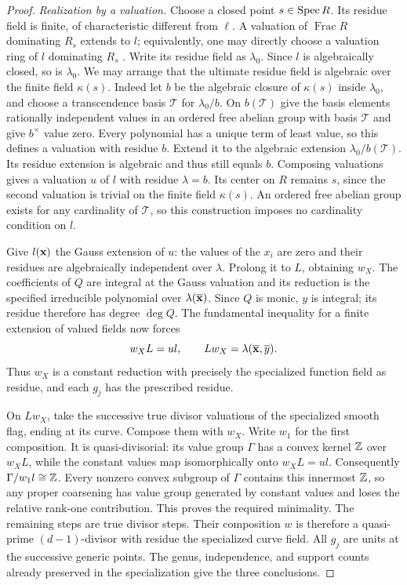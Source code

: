 \begin{proof}
\emph{Realization by a valuation.}
Choose a closed point $s\in\operatorname{Spec} R$.  Its residue field is finite, of
characteristic different from $\ell$.  A valuation of $\operatorname{Frac}R$
dominating $R_s$ extends to $l$; equivalently, one may directly choose a
valuation ring of $l$ dominating $R_s$
\cite[Lemma~10.50.2, Tag~00IA]{Stacks}.
Write its residue field as $\lambda_0$.
Since $l$ is algebraically closed, so is $\lambda_0$.
We may arrange that the ultimate residue field is algebraic over the
finite field $\kappa(s)$.  Indeed let $b$ be the algebraic closure of
$\kappa(s)$ inside $\lambda_0$, and choose a transcendence basis
$\mathcal T$ for $\lambda_0/b$.  On $b(\mathcal T)$ give the basis
elements rationally independent values in an ordered free abelian group
with basis $\mathcal T$ and give $b^\times$ value zero.
Every polynomial has a unique term of least value, so this defines a
valuation with residue $b$.  Extend it to the algebraic extension
$\lambda_0/b(\mathcal T)$.  Its residue extension is algebraic and thus
still equals $b$.  Composing valuations gives a valuation $u$ of $l$
with residue $\lambda=b$.  Its center on $R$ remains $s$, since the
second valuation is trivial on the finite field $\kappa(s)$.
An ordered free abelian group exists for any cardinality of
$\mathcal T$, so this construction imposes no cardinality condition on $l$.

Give $l({\bf x})$ the Gauss extension of $u$: the values of the $x_i$
are zero and their residues are algebraically independent over
$\lambda$.  Prolong it to $L$, obtaining $w_X$.
The coefficients of $Q$ are integral at the Gauss valuation and its
reduction is the specified irreducible polynomial over
$\lambda(\overline{\bf x})$.  Since $Q$ is monic, $y$ is integral;
its residue therefore has degree $\deg Q$.  The fundamental inequality
for a finite extension of valued fields now forces
\[
 w_XL=ul,\qquad
 Lw_X=\lambda(\overline{\bf x},\overline y).
\]
Thus $w_X$ is a constant reduction with precisely the specialized
function field as residue, and each $g_j$ has the prescribed residue.

On $Lw_X$, take the successive true divisor valuations of the
specialized smooth flag, ending at its curve.  Compose them with $w_X$.
Write $w_1$ for the first composition.  It is quasi-divisorial: its value group $\Gamma$
has a convex kernel $\mathbb Z$ over $w_XL$, while the constant values map
isomorphically onto $w_XL=ul$.  Consequently
$\Gamma/w_1l\cong\mathbb Z$.  Every nonzero convex subgroup of $\Gamma$
contains this innermost $\mathbb Z$, so any proper coarsening has value group
generated by constant values and loses the relative rank-one
contribution.  This proves the required minimality.
The remaining steps are true divisor steps.  Their composition $w$ is
therefore a quasi-prime $(d-1)$-divisor with residue the specialized
curve field.  All $g_j$ are units at the successive generic points.
The genus, independence, and support counts already preserved in the
specialization give the three conclusions.
\end{proof}

